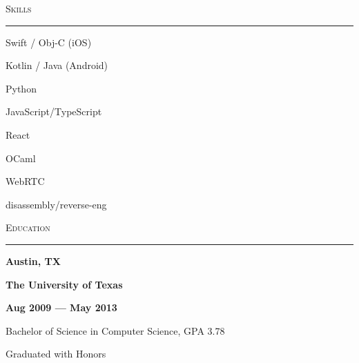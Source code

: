 \documentclass[letterpaper,12pt,oneside]{article}
\newcommand{\Heading}[1]{%
  \vspace{2ex}
  {\large\textsc{#1}} \\
  \vspace{-2ex}
  \hrule
}
\newcommand{\OneThirdBox}[1]{%
  \parbox{.333\textwidth}{#1}%
}
\newcommand{\LeftCenterRight}[4][\normalfont]{%
  \OneThirdBox{%
    \begin{flushleft}%
      #1{#2}%
    \end{flushleft}%
  }%
  \OneThirdBox{%
    \begin{center}%
      #1{#3}%
    \end{center}%
  }%
  \OneThirdBox{%
    \begin{flushright}%
      #1{#4}%
    \end{flushright}%
  }%
}
\newenvironment{Role}[4]
{
  \LeftCenterRight[\textbf]{#1}{#2}{#3 --- #4}
  \begin{compactitem}
  \vspace{-2ex}
}
{
  \end{compactitem}
  \vspace{-1ex}
}
\begin{document}

\Heading{Skills}
\vspace{2ex}
\begin{multicols}{3}
\small
\begin{compactitem}
  \item Swift / Obj-C (iOS)
  \item Kotlin / Java (Android)
  \item Python
  \item JavaScript/TypeScript
  \item React
  \item OCaml
  \item WebRTC
  \item disassembly/reverse-eng
\end{compactitem}
\normalsize
\end{multicols}


\Heading{Education}

\begin{Role}
  {Austin, TX}
  {The University of Texas}
  {Aug 2009}
  {May 2013}
  \item Bachelor of Science in Computer Science, GPA 3.78
  \item Graduated with Honors
\end{Role}
\end{document}
